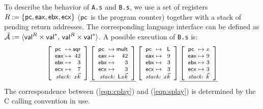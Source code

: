 \begin{example}
To describe the behavior of \texttt{A.s} and \texttt{B.s},
we use a set of registers
$R := \{  \mathsf{pc} ,  \mathsf{eax} ,  \mathsf{ebx} ,  \mathsf{ecx}  \}$
($ \mathsf{pc} $ is the program counter)
together with a stack of pending return addresses.
The corresponding language interface can be defined as
$\tilde{\mathcal{A}} :=
 \langle  \mathsf{val} ^R \times  \mathsf{val} ^*, \,
          \mathsf{val} ^R \times  \mathsf{val} ^* \rangle$.
A possible execution of \texttt{B.s}
is: %
\begin{equation} \label{eqn:splay}
{
  \footnotesize
  \left[
    \begin{array}{l@{{} \mapsto {}}r}
      \kw{pc}  & \kw{sqr} \\
      \kw{eax} & 42 \\
      \kw{ebx} & 3 \\
      \kw{ecx} & 7 \\
      \multicolumn{2}{r}{\textit{stack: } x \vec{k}}
    \end{array}
  \right] %
  \underline{
    \left[
      \begin{array}{l@{{} \mapsto {}}r}
        \kw{pc}  & \kw{mult} \\
        \kw{eax} & 42 \\
        \kw{ebx} & 3 \\
        \kw{ecx} & 3 \\
        \multicolumn{2}{r}{\textit{stack: } \kw{L} x \vec{k}}
      \end{array}
    \right]} %
  \left[
    \begin{array}{l@{{} \mapsto {}}r}
      \kw{pc}  & \kw{L} \\
      \kw{eax} & 9 \\
      \kw{ebx} & 3 \\
      \kw{ecx} & 3 \\
      \multicolumn{2}{r}{\textit{stack: } x \vec{k}}
    \end{array}
  \right] %
  \underline{
    \left[
      \begin{array}{l@{{} \mapsto {}}r}
        \kw{pc}  & x \\
        \kw{eax} & 9 \\
        \kw{ebx} & 3 \\
        \kw{ecx} & 3 \\
        \multicolumn{2}{r}{\textit{stack: } \vec{k}}
      \end{array}
    \right]}
}
\end{equation}
The correspondence between (\ref{eqn:cplay}) and (\ref{eqn:splay})
is determined by the C calling convention in use.
\end{example}

